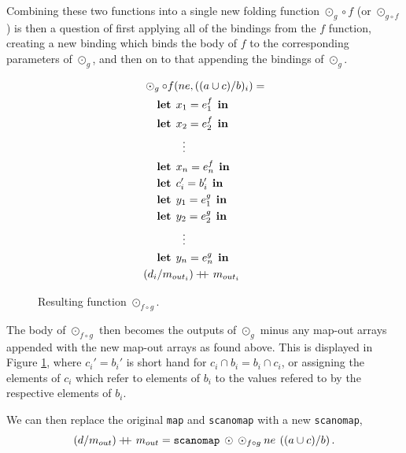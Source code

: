 \documentclass[11pt]{article}
\newcommand\doubleplus{+\kern-1.3ex+\kern0.8ex}
\newcommand\lett{\phantom{-}\:\:\mathbf{let}\:\:}
\newcommand\inn{\:\:\mathbf{in}\:\:}
\begin{document}
Combining these two functions into a single new folding function $\odot_g \circ f$ (or $\odot_{g \circ f}$) is then a question of first applying all of the bindings
 from the $f$ function, creating a new binding which binds the body of $f$ to the corresponding parameters of $\odot_g$, and then on
 to that appending the bindings of $\odot_g$.

\begin{figure}[h!]\centering
  \begin{mdframed}[style=alignbox]
    \begin{align*}
      &\odot_{g} \circ f(ne, ((a \cup c) / b)_i) = \\
      &\lett x_1 = e_1^f \inn\\
      &\lett x_2 = e_2^f \inn\\
      &\phantom{----}\vdots\\
      &\lett x_n = e_n^f \inn\\
      &\lett c_i' = b_i' \inn\\
      &\lett y_1 = e_1^g \inn\\
      &\lett y_2 = e_2^g \inn\\
      &\phantom{----}\vdots\\
      &\lett y_n = e_n^g \inn\\
      &(d_i /m_{out_i}) \doubleplus m_{out_i}
    \end{align*}
  \end{mdframed}

  \caption{Resulting function $\odot_{f \circ g}$.}
  \label{fig:fusresfun}
\end{figure}
The body of $\odot_{f\circ g}$ then becomes the outputs of $\odot_g$ minus any map-out arrays appended with the new map-out arrays as
 found above. This is displayed in Figure \ref{fig:fusresfun}, where $c_i' = b_i'$ is short hand for $c_i \cap b_i = b_i \cap c_i$, or
 assigning the elements of $c_i$ which refer to elements of $b_i$ to the values refered to by the respective elements of $b_i$.

We can then replace the original \texttt{map} and \texttt{scanomap} with a new \texttt{scanomap},
$$(d / m_{out}) \doubleplus m_{out} = \mathtt{scanomap} \: \odot \: \odot_{f \circ g} \: ne \: \left((a \cup c) / b \right)\mathnormal{.} $$
\end{document}
